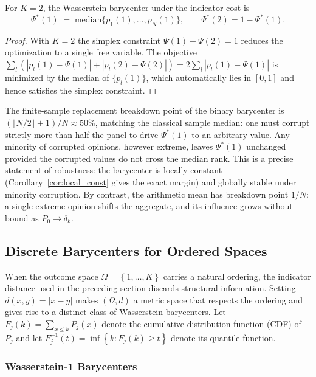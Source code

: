\begin{corollary}
\label{cor:binary}
For $K=2$, the Wasserstein barycenter under the indicator cost is
\[
  \Psi^*(1) \;=\; \mathrm{median}\{p_1(1),\ldots,p_N(1)\}, \qquad \Psi^*(2) = 1 - \Psi^*(1).
\]
\end{corollary}
\begin{proof}
With $K=2$ the simplex constraint $\Psi(1)+\Psi(2)=1$ reduces the optimization to a single free variable.  The objective $\sum_l(|p_l(1)-\Psi(1)|+|p_l(2)-\Psi(2)|) = 2\sum_l|p_l(1)-\Psi(1)|$ is minimized by the median of $\{p_l(1)\}$, which automatically lies in $[0,1]$ and hence satisfies the simplex constraint.
\end{proof}
\begin{remark}
The finite-sample replacement breakdown point of the binary barycenter is $(\lfloor N/2\rfloor + 1)/N \approx 50\%$, matching the classical sample median: one must corrupt strictly more than half the panel to drive $\Psi^*(1)$ to an arbitrary value.  Any minority of corrupted opinions, however extreme, leaves $\Psi^*(1)$ unchanged provided the corrupted values do not cross the median rank.  This is a precise statement of robustness: the barycenter is locally constant (Corollary~\ref{cor:local_const} gives the exact margin) and globally stable under minority corruption.  By contrast, the arithmetic mean has breakdown point $1/N$: a single extreme opinion shifts the aggregate, and its influence grows without bound as $P_0 \to \delta_k$.
\end{remark}

\subsection{Discrete Barycenters for Ordered Spaces}
\label{sec:ordered}

When the outcome space $\Omega = \left\{1,\ldots,K\right\}$ carries a natural ordering, the indicator distance used in the preceding section discards structural information.  Setting $d(x,y)=|x-y|$ makes $(\Omega,d)$ a metric space that respects the ordering and gives rise to a distinct class of Wasserstein barycenters.  Let $F_j(k)=\sum_{x\leq k}P_j(x)$ denote the cumulative distribution function (CDF) of $P_j$ and let $F_j^{-1}(t)=\inf\left\{k:F_j(k)\geq t\right\}$ denote its quantile function.

\subsubsection*{Wasserstein-1 Barycenters}

